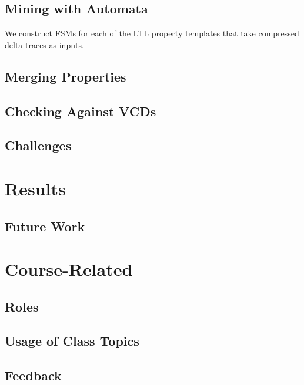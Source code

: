 \documentclass[acmlarge,11pt]{acmart}
\begin{document}
\subsection{Mining with Automata}
We construct FSMs for each of the LTL property templates that take compressed delta traces as inputs.

\subsection{Merging Properties}

\subsection{Checking Against VCDs}

\subsection{Challenges}

\section{Results}

\subsection{Future Work}
% 

\section{Course-Related}

\subsection{Roles}

\subsection{Usage of Class Topics}

\subsection{Feedback}
\end{document}
